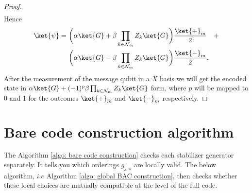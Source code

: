 \documentclass[reprint, amsmath,amssymb, aps,pra,
 floatfix,
]{revtex4-2}
\begin{document}
\begin{proof}
\begin{equation*}
\begin{split}
\end{split}
\end{equation*}
Hence 
\begin{equation*}
\begin{split}
    \ket{\psi}=\ & \biggl( \alpha \ket{G} + \beta\prod_{k\in \mathcal{N}_{m}}Z_k\ket{G} \biggl) \dfrac{\ket{+}_m}{2} \quad + \\ &\biggl( \alpha \ket{G} - \beta\prod_{k\in \mathcal{N}_{m}}Z_k\ket{G} \biggl) \dfrac{\ket{-}_m}{2}.
\end{split}
\end{equation*}
\noindent After the measurement of the message qubit in a $X$ basis we will get the encoded state in  $\alpha \ket{G} + (-1)^{p}\beta\prod_{k\in \mathcal{N}_{m}}Z_k\ket{G} $ form, where $p$ will be mapped to 0  and 1 for the outcomes  $\ket{+}_{m}$ and $\ket{-}_{m}$ respectively. 
\end{proof}

\section{Bare code construction algorithm}
\label{APPENDIX: Bare code construction algorithm}
\noindent The Algorithm \ref{algo: bare code construction} checks each stabilizer generator separately.
It tells you which orderings $g_{j,\pi}$ are locally valid.
The below algorithm, $i.e$ Algorithm \ref{algo: global BAC construction}, then checks whether these local choices are mutually compatible at the level of the full code.
\end{document}
